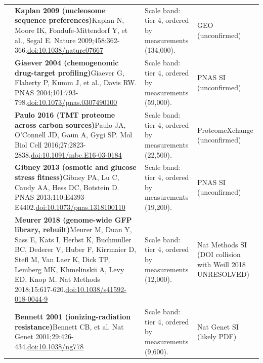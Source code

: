 \begin{landscape}
\begin{longtable}{@{}r@{\hspace{4pt}} L{86mm} L{92mm} L{62mm}@{}}
 & \textbf{Kaplan 2009 (nucleosome sequence preferences)}\newline Kaplan N, Moore IK, Fondufe-Mittendorf Y, et al., Segal E. Nature 2009;458:362-366.\newline \href{https://doi.org/10.1038/nature07667}{doi:10.1038/\allowbreak nature07667} & Scale band: tier 4, ordered by measurements (134,000). & GEO (unconfirmed) \\
 & \textbf{Giaever 2004 (chemogenomic drug-target profiling)}\newline Giaever G, Flaherty P, Kumm J, et al., Davis RW. PNAS 2004;101:793-798.\newline \href{https://doi.org/10.1073/pnas.0307490100}{doi:10.1073/\allowbreak pnas.0307490100} & Scale band: tier 4, ordered by measurements (59,000). & PNAS SI (unconfirmed) \\
 & \textbf{Paulo 2016 (TMT proteome across carbon sources)}\newline Paulo JA, O'Connell JD, Gaun A, Gygi SP. Mol Biol Cell 2016;27:2823-2838.\newline \href{https://doi.org/10.1091/mbc.E16-03-0184}{doi:10.1091/\allowbreak mbc.E16-03-0184} & Scale band: tier 4, ordered by measurements (22,500). & ProteomeXchange (unconfirmed) \\
 & \textbf{Gibney 2013 (osmotic and glucose stress fitness)}\newline Gibney PA, Lu C, Caudy AA, Hess DC, Botstein D. PNAS 2013;110:E4393-E4402.\newline \href{https://doi.org/10.1073/pnas.1318100110}{doi:10.1073/\allowbreak pnas.1318100110} & Scale band: tier 4, ordered by measurements (19,200). & PNAS SI (unconfirmed) \\
 & \textbf{Meurer 2018 (genome-wide GFP library, rebuilt)}\newline Meurer M, Duan Y, Sass E, Kats I, Herbst K, Buchmuller BC, Dederer V, Huber F, Kirrmaier D, Stefl M, Van Laer K, Dick TP, Lemberg MK, Khmelinskii A, Levy ED, Knop M. Nat Methods 2018;15:617-620.\newline \href{https://doi.org/10.1038/s41592-018-0044-9}{doi:10.1038/\allowbreak s41592-018-0044-9} & Scale band: tier 4, ordered by measurements (12,000). & Nat Methods SI (DOI collision with Weill 2018 UNRESOLVED) \\
 & \textbf{Bennett 2001 (ionizing-radiation resistance)}\newline Bennett CB, et al. Nat Genet 2001;29:426-434.\newline \href{https://doi.org/10.1038/ng778}{doi:10.1038/\allowbreak ng778} & Scale band: tier 4, ordered by measurements (9,600). & Nat Genet SI (likely PDF) \\

\end{longtable}
\end{landscape}
